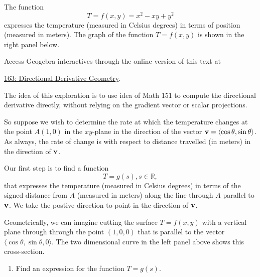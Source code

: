 \documentclass{ximera}
\begin{document}
\begin{exploration}  \label{Edf45t54t54t4}
The function
\[
     T = f(x,y) = x^2 - xy + y^2  
\]
expresses the temperature (measured in Celsius degrees) in terms of position (measured in meters). The graph of the function $T= f(x,y)$ is shown in the right panel below.



 
\begin{onlineOnly}
    \begin{center}
\end{center}
\end{onlineOnly}

Access Geogebra interactives through the online version of this text at
 
\href{https://www.geogebra.org/classic/rdezhzbs}{163: Directional Derivative Geometry}.

The idea of this exploration is to use idea of Math 151 to compute the directional derivative directly, without relying on the gradient vector or scalar projections.

So suppose we wish to determine the rate at which the temperature changes at the point $A(1,0)$ in the $xy$-plane in the direction of the vector ${\bf v} = \langle \cos\theta, \sin\theta \rangle$. As always, the rate of change is with respect to distance travelled (in meters) in the direction of ${\bf v}$. 

Our first step is to find a function
\[
     T = g(s) , s\in \mathbb{R},
\] 
that expresses the temperature (measured in Celsius degrees) in terms of the signed distance from $A$ (measured in meters) along the line through $A$ parallel to ${\bf v}$. We take the postive direction to point in the direction of ${\bf v}$.

Geometrically, we can imagine cutting the surface $T=f(x,y)$ with a vertical plane through through the point $(1,0,0)$ that is parallel to the vector $ \langle \cos\theta, \sin\theta , 0\rangle$. The two dimensional curve in the left panel above shows this cross-section.

\begin{enumerate}

\item Find an expression for the function $T=g(s)$.


\end{enumerate}
\end{exploration}
\end{document}

